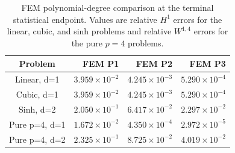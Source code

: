 \begin{table}[htbp]
\centering\small
\caption{FEM polynomial-degree comparison at the terminal statistical endpoint. Values are relative $H^1$ errors for the linear, cubic, and sinh problems and relative $W^{1,4}$ errors for the pure \(p=4\) problems.}
\label{tab:p-degree-sensitivity}
\begin{tabular}{@{}crrr@{}}
\toprule
Problem & FEM P1 & FEM P2 & FEM P3 \\ \midrule
Linear, d=1 & $3.959\!\times\!10^{-2}$ & $4.245\!\times\!10^{-3}$ & $5.290\!\times\!10^{-4}$ \\
Cubic, d=1 & $3.959\!\times\!10^{-2}$ & $4.245\!\times\!10^{-3}$ & $5.290\!\times\!10^{-4}$ \\
Sinh, d=2 & $2.050\!\times\!10^{-1}$ & $6.417\!\times\!10^{-2}$ & $2.297\!\times\!10^{-2}$ \\
Pure p=4, d=1 & $1.672\!\times\!10^{-2}$ & $4.350\!\times\!10^{-4}$ & $2.972\!\times\!10^{-5}$ \\
Pure p=4, d=2 & $2.325\!\times\!10^{-1}$ & $8.725\!\times\!10^{-2}$ & $4.019\!\times\!10^{-2}$ \\
\bottomrule
\end{tabular}
\end{table}
